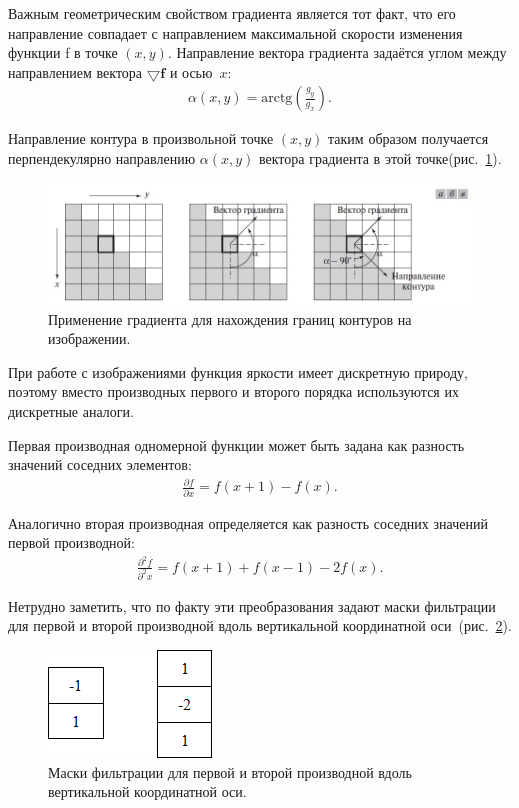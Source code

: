 \documentclass[12pt,a4paper]{article} %
\begin{document}
Важным геометрическим свойством градиента является тот факт, что его направление совпадает с направлением максимальной скорости изменения функции f в точке $(x, y)$. Направление вектора градиента задаётся углом между направлением вектора $\bigtriangledown \mathbf{f}$ и осью~$x$:
\begin{gather}\label{grad_alpha}
	\alpha(x, y) = \text{arctg}\left(\frac{g_y}{g_x}\right).
\end{gather}

Направление контура в произвольной точке $(x,y)$ таким образом получается перпендекулярно направлению $\alpha(x,y)$ вектора градиента в этой точке(рис.~\ref{fig:grad}).


\begin{figure}[h]
	
	\centering
	
	\includegraphics[width=0.7\linewidth]{grad.jpg}
	
	\caption{Применение градиента для нахождения границ контуров на изображении.}
	
	\label{fig:grad}
	
\end{figure}

При работе с изображениями функция яркости имеет дискретную природу, поэтому вместо производных первого и второго порядка используются их дискретные аналоги.

Первая производная одномерной функции может быть задана как разность значений соседних элементов:
\begin{gather}\label{first}
	\frac{\partial f}{\partial x}=
	f(x+1) - f(x).
\end{gather}

Аналогично вторая производная определяется как разность соседних значений первой производной:
\begin{gather}\label{second}
	\frac{\partial^2 f}{\partial^2 x}=
	f(x+1) + f(x-1) -2f(x).
\end{gather}

Нетрудно заметить, что по факту эти преобразования задают маски фильтрации для первой и второй производной вдоль вертикальной координатной оси~(рис.~\ref{fig:grad_mask}).
\begin{figure}[h]
	
	\centering
	
	\includegraphics[width=0.2\linewidth]{grad_mask.jpg}
	
	\caption{Маски фильтрации для первой и второй производной вдоль вертикальной координатной оси.}
	
	\label{fig:grad_mask}
	
\end{figure}
\end{document}
